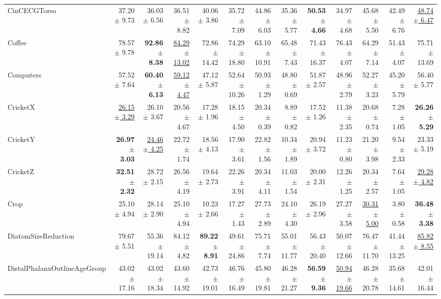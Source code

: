 \begin{landscape}
\begin{longtable}{lrrrrrrrrrrrr}
CinCECGTorso & 37.20 $\pm$ 9.73 & 36.03 $\pm$ 6.56 & 36.51 $\pm$ 8.82 & 40.06 $\pm$ 3.86 & 35.72 $\pm$ 7.09 & 44.86 $\pm$ 6.03 & 35.36 $\pm$ 5.77 & \textbf{50.53 $\pm$ 4.66} & 34.97 $\pm$ 4.68 & 45.68 $\pm$ 5.50 & 42.49 $\pm$ 6.76 & \underline{48.74 $\pm$ 6.47} \\
Coffee & 78.57 $\pm$ 9.78 & \textbf{92.86 $\pm$ 8.38} & \underline{84.29 $\pm$ 13.02} & 72.86 $\pm$ 14.42 & 74.29 $\pm$ 18.80 & 63.10 $\pm$ 10.91 & 65.48 $\pm$ 7.43 & 71.43 $\pm$ 16.37 & 76.43 $\pm$ 4.07 & 64.29 $\pm$ 7.14 & 51.43 $\pm$ 4.07 & 75.71 $\pm$ 13.69 \\
Computers & 57.52 $\pm$ 7.64 & \textbf{60.40 $\pm$ 6.13} & \underline{59.12 $\pm$ 4.47} & 47.12 $\pm$ 5.87 & 52.64 $\pm$ 10.26 & 50.93 $\pm$ 1.29 & 48.80 $\pm$ 0.69 & 51.87 $\pm$ 2.57 & 48.96 $\pm$ 2.79 & 52.27 $\pm$ 3.23 & 45.20 $\pm$ 5.79 & 56.40 $\pm$ 5.77 \\
CricketX & \underline{26.15 $\pm$ 3.29} & 26.10 $\pm$ 3.67 & 20.56 $\pm$ 4.67 & 17.28 $\pm$ 1.96 & 18.15 $\pm$ 4.50 & 20.34 $\pm$ 0.39 & 8.89 $\pm$ 0.82 & 17.52 $\pm$ 1.26 & 11.38 $\pm$ 2.35 & 20.68 $\pm$ 0.74 & 7.28 $\pm$ 1.05 & \textbf{26.26 $\pm$ 5.29} \\
CricketY & \textbf{26.97 $\pm$ 3.03} & \underline{24.46 $\pm$ 4.25} & 22.72 $\pm$ 1.74 & 18.56 $\pm$ 4.13 & 17.90 $\pm$ 3.61 & 22.82 $\pm$ 1.56 & 10.34 $\pm$ 1.89 & 20.94 $\pm$ 3.72 & 11.23 $\pm$ 0.80 & 21.20 $\pm$ 3.98 & 9.54 $\pm$ 2.33 & 23.33 $\pm$ 5.19 \\
CricketZ & \textbf{32.51 $\pm$ 2.32} & 28.72 $\pm$ 2.15 & 26.56 $\pm$ 4.19 & 19.64 $\pm$ 2.73 & 22.26 $\pm$ 3.91 & 20.34 $\pm$ 4.11 & 11.03 $\pm$ 1.54 & 20.00 $\pm$ 2.31 & 12.26 $\pm$ 1.25 & 20.34 $\pm$ 2.57 & 7.64 $\pm$ 1.05 & \underline{29.28 $\pm$ 4.82} \\
Crop & 25.10 $\pm$ 4.94 & 28.14 $\pm$ 2.90 & 25.10 $\pm$ 4.94 & 10.23 $\pm$ 2.66 & 17.27 $\pm$ 1.43 & 27.73 $\pm$ 2.89 & 24.10 $\pm$ 4.30 & 26.19 $\pm$ 2.96 & 27.27 $\pm$ 3.58 & \underline{30.31 $\pm$ 5.00} & 3.80 $\pm$ 0.58 & \textbf{36.48 $\pm$ 3.38} \\
DiatomSizeReduction & 79.67 $\pm$ 5.51 & 55.36 $\pm$ 19.14 & 84.12 $\pm$ 4.82 & \textbf{89.22 $\pm$ 8.91} & 49.61 $\pm$ 24.86 & 75.71 $\pm$ 7.74 & 55.01 $\pm$ 11.77 & 56.43 $\pm$ 20.40 & 50.07 $\pm$ 12.66 & 76.47 $\pm$ 11.70 & 41.44 $\pm$ 13.25 & \underline{85.82 $\pm$ 8.55} \\
DistalPhalanxOutlineAgeGroup & 43.02 $\pm$ 17.16 & 43.02 $\pm$ 18.34 & 43.60 $\pm$ 14.92 & 42.73 $\pm$ 19.01 & 46.76 $\pm$ 16.49 & 45.80 $\pm$ 19.81 & 46.28 $\pm$ 21.27 & \textbf{56.59 $\pm$ 9.36} & \underline{50.94 $\pm$ 19.66} & 46.28 $\pm$ 20.78 & 35.68 $\pm$ 14.61 & 42.01 $\pm$ 16.44 \\

\end{longtable}
\end{landscape}
